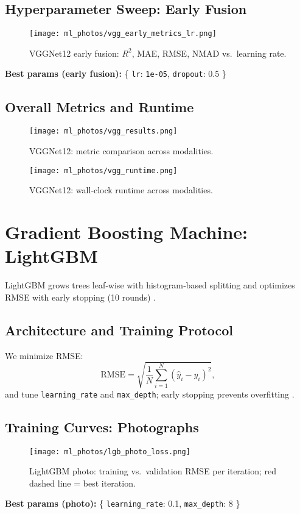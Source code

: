 \documentclass[english,bachelor,oneside]{ctufit-thesis}
\begin{document}
\subsection{Hyperparameter Sweep: Early Fusion}
\begin{figure}[H]
  \centering
  \texttt{[image: ml\_photos/vgg\_early\_metrics\_lr.png]}
  \caption{VGGNet12 early fusion: $R^2$, MAE, RMSE, NMAD vs.\ learning rate.}
  \label{fig:vgg_early_metrics}
\end{figure}
\noindent\textbf{Best params (early fusion):} \{ \texttt{lr}: \verb|1e-05|, \texttt{dropout}: 0.5 \}\\

\subsection{Overall Metrics and Runtime}
\begin{figure}[H]
  \centering
  \texttt{[image: ml\_photos/vgg\_results.png]}
  \caption{VGGNet12: metric comparison across modalities.}
  \label{fig:vgg_results}
\end{figure}

\begin{figure}[H]
  \centering
  \texttt{[image: ml\_photos/vgg\_runtime.png]}
  \caption{VGGNet12: wall‐clock runtime across modalities.}
  \label{fig:vgg_runtime}
\end{figure}

\section{Gradient Boosting Machine: LightGBM}
LightGBM grows trees leaf‐wise with histogram‐based splitting and optimizes RMSE with early stopping (10 rounds) \cite{Ke2017,Friedman2001}.

\subsection{Architecture and Training Protocol}
We minimize RMSE:
\[
  \mathrm{RMSE} = \sqrt{\frac1N\sum_{i=1}^N(\hat y_i - y_i)^2},
\]
and tune \texttt{learning\_rate} and \texttt{max\_depth}; early stopping prevents overfitting \cite{prechelt2002early}.

\subsection{Training Curves: Photographs}
\begin{figure}[H]
  \centering
  \texttt{[image: ml\_photos/lgb\_photo\_loss.png]}
  \caption{LightGBM photo: training vs.\ validation RMSE per iteration; red dashed line = best iteration.}
  \label{fig:lgb_photo_loss}
\end{figure}
\noindent\textbf{Best params (photo):} \{ \texttt{learning\_rate}: 0.1, \texttt{max\_depth}: 8 \}\\
\end{document}
